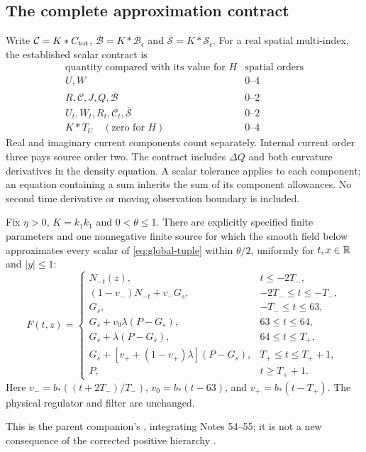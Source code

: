 \subsection{The complete approximation contract}
Write $\mathcal C=K*C_{\rm tot}$,
$\overline{\mathcal B}=K*\mathcal B_\epsilon$ and
$\overline{\mathcal S}=K*\mathcal S_\epsilon$. For a real spatial
multi-index, the established scalar contract is
\begin{equation}
 \begin{array}{c|c}
 \text{quantity compared with its value for }H&\text{spatial orders}\\\hline
 U,W&0\text{--}4\\
 R,\mathcal C,J,Q,\overline{\mathcal B}&0\text{--}2\\
 U_t,W_t,R_t,\mathcal C_t,\overline{\mathcal S}&0\text{--}2\\
 K*T_U\quad(\text{zero for }H)&0\text{--}4
 \end{array}
 \label{eq:global-tuple}
\end{equation}
Real and imaginary current components count separately. Internal current
order three pays source order two. The contract includes $\Delta Q$
and both curvature derivatives in the density equation. A scalar
tolerance applies to each component; an equation containing a sum
inherits the sum of its component allowances. No second time derivative
or moving observation boundary is included.

\begin{theorem}
\label{thm:global}
Fix $\eta>0$, $K=k_1k_1$ and $0<\theta\le1$. There are explicitly
specified finite parameters and one nonnegative finite source for which
the smooth field below approximates every scalar of
\eqref{eq:global-tuple} within $\theta/2$, uniformly for
$t,x\in\mathbb R$ and $|y|\le1$:
\begin{equation}
 F(t,z)=\begin{cases}
 N_{-t}(z),&t\le-2T_-,\\
 (1-v_-)N_{-t}+v_-G_s,&-2T_-\le t\le-T_-,\\
 G_s,&-T_-\le t\le63,\\
 G_s+v_0\lambda(P-G_s),&63\le t\le64,\\
 G_s+\lambda(P-G_s),&64\le t\le T_+,\\
 G_s+[v_++(1-v_+)\lambda](P-G_s),&T_+\le t\le T_++1,\\
 P,&t\ge T_++1.
 \end{cases}
 \label{eq:global-field}
\end{equation}
Here $v_-=b_*((t+2T_-)/T_-)$, $v_0=b_*(t-63)$, and
$v_+=b_*(t-T_+)$. The physical regulator and filter are unchanged.
\end{theorem}
This is the parent companion's
,
integrating Notes 54--55; it is not a new consequence of the corrected
positive hierarchy \cite{global,conditioning}.

